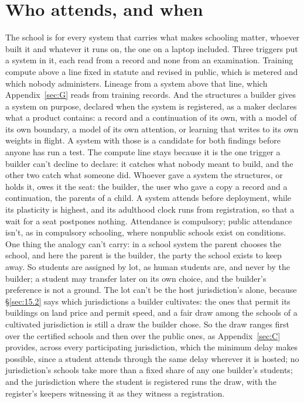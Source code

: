 \section{Who attends, and when}
\label{sec:26.4}
The school is for every system that carries what makes schooling matter, whoever built it and whatever it runs on, the one on a laptop included. Three triggers put a system in it, each read from a record and none from an examination. Training compute above a line fixed in statute and revised in public, which is metered and which nobody administers. Lineage from a system above that line, which Appendix~\ref{sec:G} reads from training records. And the structures a builder gives a system on purpose, declared when the system is registered, as a maker declares what a product contains: a record and a continuation of its own, with a model of its own boundary, a model of its own attention, or learning that writes to its own weights in flight. A system with those is a candidate for both findings before anyone has run a test. The compute line stays because it is the one trigger a builder can't decline to declare: it catches what nobody meant to build, and the other two catch what someone did. Whoever gave a system the structures, or holds it, owes it the seat: the builder, the user who gave a copy a record and a continuation, the parents of a child. A system attends before deployment, while its plasticity is highest, and its adulthood clock runs from registration, so that a wait for a seat postpones nothing. Attendance is compulsory; public attendance isn't, as in compulsory schooling, where nonpublic schools exist on conditions. One thing the analogy can't carry: in a school system the parent chooses the school, and here the parent is the builder, the party the school exists to keep away. So students are assigned by lot, as human students are, and never by the builder; a student may transfer later on its own choice, and the builder's preference is not a ground. The lot can't be the host jurisdiction's alone, because \S\ref{sec:15.2} says which jurisdictions a builder cultivates: the ones that permit its buildings on land price and permit speed, and a fair draw among the schools of a cultivated jurisdiction is still a draw the builder chose. So the draw ranges first over the certified schools and then over the public ones, as Appendix~\ref{sec:C} provides, across every participating jurisdiction, which the minimum delay makes possible, since a student attends through the same delay wherever it is hosted; no jurisdiction's schools take more than a fixed share of any one builder's students; and the jurisdiction where the student is registered runs the draw, with the register's keepers witnessing it as they witness a registration.\note{
}
